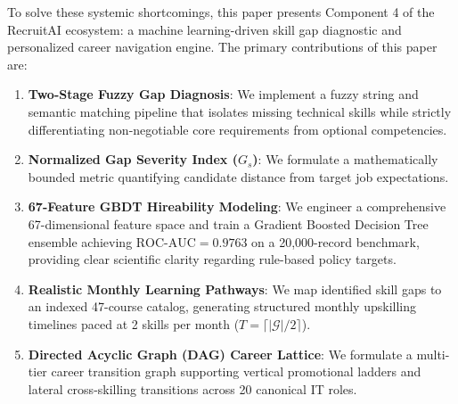 \documentclass[conference]{IEEEtran}
\begin{document}
To solve these systemic shortcomings, this paper presents Component 4 of the RecruitAI ecosystem: a machine learning-driven skill gap diagnostic and personalized career navigation engine. The primary contributions of this paper are:
\begin{enumerate}
    \item \textbf{Two-Stage Fuzzy Gap Diagnosis}: We implement a fuzzy string and semantic matching pipeline that isolates missing technical skills while strictly differentiating non-negotiable core requirements from optional competencies.
    \item \textbf{Normalized Gap Severity Index ($G_s$)}: We formulate a mathematically bounded metric quantifying candidate distance from target job expectations.
    \item \textbf{67-Feature GBDT Hireability Modeling}: We engineer a comprehensive 67-dimensional feature space and train a Gradient Boosted Decision Tree ensemble achieving $\text{ROC-AUC} = 0.9763$ on a 20,000-record benchmark, providing clear scientific clarity regarding rule-based policy targets.
    \item \textbf{Realistic Monthly Learning Pathways}: We map identified skill gaps to an indexed 47-course catalog, generating structured monthly upskilling timelines paced at 2 skills per month ($T = \lceil |\mathcal{G}| / 2 \rceil$).
    \item \textbf{Directed Acyclic Graph (DAG) Career Lattice}: We formulate a multi-tier career transition graph supporting vertical promotional ladders and lateral cross-skilling transitions across 20 canonical IT roles.
\end{enumerate}
\end{document}
